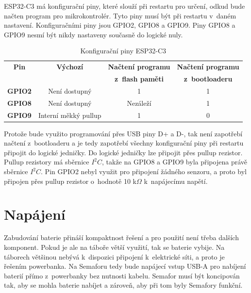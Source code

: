 ESP32-C3 má konfigurační piny, které slouží při restartu pro určení, odkud bude načten program pro mikrokontrolér. Tyto piny musí být při restartu v~daném nastavení. 
Konfiguračními piny jsou GPIO2, GPIO8 a GPIO9. Piny GPIO8 a GPIO9 nesmí být nikdy nastaveny současně do logické nuly. 

\begin{table}[!h]
  \caption[Konfigurační piny ESP32-C3]{Konfigurační piny ESP32-C3 \cite{ESP_C3_dtsh}}
  \begin{center}
  	\small
	  \begin{tabular}{|c|c|c|c|}
	    \hline
	    \textbf{Pin}	& \textbf{Výchozí}	& \textbf{Načtení programu} & \textbf{Načtení programu} \\
      \textbf{}	& \textbf{}	& \textbf{z~flash paměti} & \textbf{z~bootloaderu} \\
	    \hline
	    \textbf{GPIO2}	& Není dostupný & 1 & 1 \\ 
	    \hline
	    \textbf{GPIO8}	& Není dostupný & Nezáleží & 1 \\ 
	    \hline
	    \textbf{GPIO9} & Interní měkký pullup & 1 & 0 \\
	    \hline
	  \end{tabular}
  \end{center}
\end{table}

Protože bude využito programování přes USB piny D+ a D-, tak není zapotřebí načtení z~bootloaderu a je tedy zapotřebí všechny konfigurační piny při restartu připojit do 
logické jedničky. Do logické jedničky lze připojit přes pullup rezistor. Pullup rezistory má sběrnice $I^2C$, takže na GPIO8 a GPIO9 byla připojena právě sběrnice $I^2C$.
Pin GPIO2 nebyl využit pro připojení žádného senzoru, a proto byl připojen přes pullup rezistor o~hodnotě 10 k$\Omega$ k~napájecímu napětí.

\section{Napájení}
Zabudování baterie přináší kompaktnost řešení a pro použití není třeba dalších komponent. Pokud je ale na táboře větší využití, tak se baterie vybije.
Na táborech většinou nebývá k~dispozici připojení k~elektrické síti, a proto je řešením powerbanka. Na Semaforu tedy bude napájecí vstup USB-A pro nabíjení baterií
přímo z~powerbanky bez nutnosti kabelu. Semafor musí být koncipován tak, aby se mohla baterie nabíjet a zároveň, aby při tom byly Semafory funkční.

